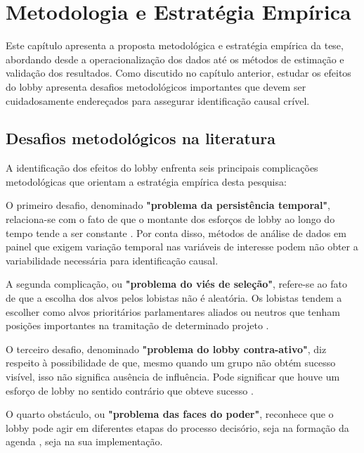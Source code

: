 \chapter{Metodologia e Estratégia Empírica}
\label{chapter:metodologia}

Este capítulo apresenta a proposta metodológica e estratégia empírica da tese, abordando desde a operacionalização dos dados até os métodos de estimação e validação dos resultados. Como discutido no capítulo anterior, estudar os efeitos do lobby apresenta desafios metodológicos importantes que devem ser cuidadosamente endereçados para assegurar identificação causal crível.

\section{Desafios metodológicos na literatura}

A identificação dos efeitos do lobby enfrenta seis principais complicações metodológicas que orientam a estratégia empírica desta pesquisa:

O primeiro desafio, denominado \textbf{"problema da persistência temporal"}, relaciona-se com o fato de que o montante dos esforços de lobby ao longo do tempo tende a ser constante \cite{de_figueiredo_advancing_2014}. Por conta disso, métodos de análise de dados em painel que exigem variação temporal nas variáveis de interesse podem não obter a variabilidade necessária para identificação causal.

A segunda complicação, ou \textbf{"problema do viés de seleção"}, refere-se ao fato de que a escolha dos alvos pelos lobistas não é aleatória. Os lobistas tendem a escolher como alvos prioritários parlamentares aliados \cite{kollman1998outside, caldeira2000lobbying, hojnacki2001pac} ou neutros \cite{holyoke2003choosing, kelleher2009political, bertrand2014whom, gawande2012lobbying} que tenham posições importantes na tramitação de determinado projeto \cite{marshall2010lobby}.

O terceiro desafio, denominado \textbf{"problema do lobby contra-ativo"}, diz respeito à possibilidade de que, mesmo quando um grupo não obtém sucesso visível, isso não significa ausência de influência. Pode significar que houve um esforço de lobby no sentido contrário que obteve sucesso \cite{austen1996theory}.

O quarto obstáculo, ou \textbf{"problema das faces do poder"}, reconhece que o lobby pode agir em diferentes etapas do processo decisório, seja na formação da agenda \cite{bachrach1962two}, seja na sua implementação.

